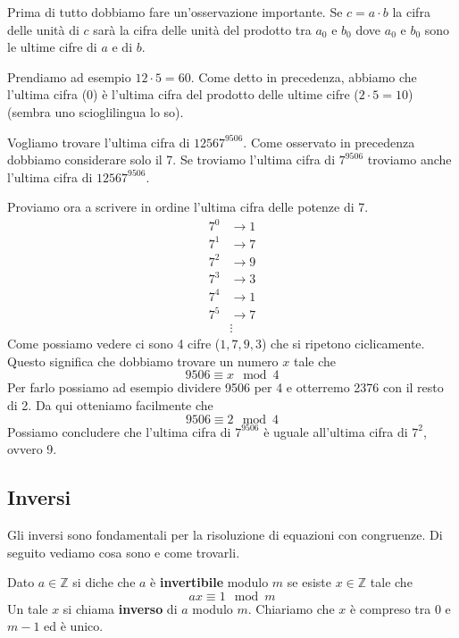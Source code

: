 Prima di tutto dobbiamo fare un'osservazione importante. Se $c = a \cdot b$ la cifra delle
unit\`a di $c$ sar\`a la cifra delle unit\`a del prodotto tra $a_0$ e $b_0$ dove $a_0$ e $b_0$
sono le ultime cifre di $a$ e di $b$.

\begin{example}
	Prendiamo ad esempio $12 \cdot 5 = 60$. Come detto in precedenza, abbiamo che l'ultima
	cifra (0) \`e l'ultima cifra del prodotto delle ultime cifre ($2 \cdot 5 = 10$)
	(sembra uno scioglilingua lo so).
\end{example}

\begin{example}
	Vogliamo trovare l'ultima cifra di $12567^{9506}$. Come osservato in precedenza dobbiamo
	considerare solo il 7. Se troviamo l'ultima cifra di $7^{9506}$ troviamo anche l'ultima
	cifra di $12567^{9506}$.

	Proviamo ora a scrivere in ordine l'ultima cifra delle potenze di 7.
	\begin{equation*}
		\begin{array}{rl}
			7^0 & \rightarrow 1 \\
			7^1 & \rightarrow 7 \\
			7^2 & \rightarrow 9 \\
			7^3 & \rightarrow 3 \\
			7^4 & \rightarrow 1 \\
			7^5 & \rightarrow 7 \\
			    & \vdots
		\end{array}
	\end{equation*}
	Come possiamo vedere ci sono 4 cifre ($1, 7, 9, 3$) che si ripetono ciclicamente. Questo
	significa che dobbiamo trovare un numero $x$ tale che
	\begin{equation*}
		9506 \equiv x \mod{4}
	\end{equation*}
	Per farlo possiamo ad esempio dividere 9506 per 4 e otterremo 2376 con il resto di 2.
	Da qui otteniamo facilmente che
	\begin{equation*}
		9506 \equiv 2 \mod{4}
	\end{equation*}
	Possiamo concludere che l'ultima cifra di $7^{9506}$ \`e uguale all'ultima cifra di
	$7^2$, ovvero 9.
\end{example}

\subsection{Inversi}
Gli inversi sono fondamentali per la risoluzione di equazioni con congruenze. Di seguito
vediamo cosa sono e come trovarli.
\begin{defn}
	Dato $a \in \mathbb{Z}$ si diche che $a$ \`e \textbf{invertibile} modulo $m$ se esiste
	$x \in \mathbb{Z}$ tale che
	\begin{equation*}
		ax \equiv 1 \mod{m}
	\end{equation*}
	Un tale $x$ si chiama \textbf{inverso} di $a$ modulo $m$. Chiariamo che $x$ \`e compreso
	tra 0 e $m - 1$ ed \`e unico.
\end{defn}

